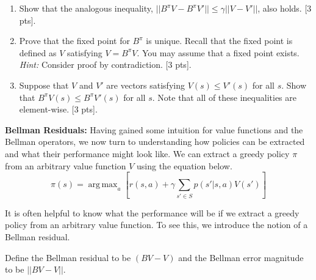 \documentclass[11pt]{article}
\DeclareMathOperator*{\argmax}{arg\,max}
\begin{document}
\begin{enumerate}[label=(\alph*)]
    \item Show that the analogous inequality, $|| B^\pi V - B^\pi V' || \leq \gamma ||V - V'||$, also holds. [3 pts].

    \begin{tcolorbox}[breakable]

    \end{tcolorbox}
    \newpage
    \item Prove that the fixed point for $B^\pi$ is unique. Recall that the fixed point is defined as $V$ satisfying $V = B^\pi V$. You may assume that a fixed point exists. \textit{Hint:} Consider proof by contradiction. [3 pts].

    \begin{tcolorbox}[breakable]

    \end{tcolorbox}
    \newpage
    \item Suppose that $V$ and $V'$ are vectors satisfying $V(s) \leq V'(s)$ for all $s$. Show that $B^\pi V(s) \leq B^\pi V'(s)$ for all $s$. Note that all of these inequalities are element-wise. [3 pts].
    
    \begin{tcolorbox}[breakable]

    \end{tcolorbox}
    \newpage
\end{enumerate}


\noindent \textbf{Bellman Residuals:} Having gained some intuition for value functions and the Bellman operators, we now turn to understanding how policies can be extracted and what their performance might look like. We can extract a greedy policy $\pi$ from an arbitrary value function $V$ using the equation below. 
\begin{equation}
    \pi(s) = \argmax_{a} [{r(s,a) + \gamma\sum_{s' \in S}p(s'|s,a)V(s')}]
\end{equation}

It is often helpful to know what the performance will be if we extract a greedy policy from an arbitrary value function. To see this, we introduce the notion of a Bellman residual.

Define the Bellman residual to be $(BV - V)$ and the Bellman error magnitude to be $||BV - V||$.
\end{document}

